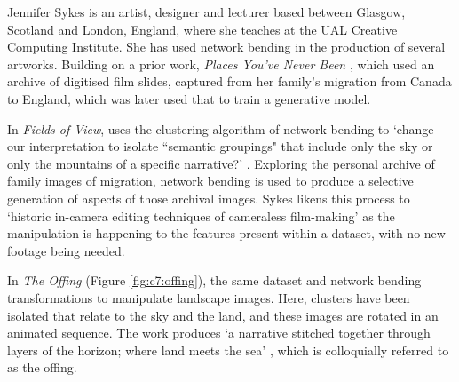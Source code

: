 Jennifer Sykes is an artist, designer and lecturer based between Glasgow, Scotland and London, England, where she teaches at the UAL Creative Computing Institute.
She has used network bending in the production of several artworks. Building on a prior work, \textit{Places You’ve Never Been} \citep{sykes2018places}, which used an archive of digitised film slides, captured from her family's migration from Canada to England, which was later used that to train a generative model. 

In \textit{Fields of View}, uses the clustering algorithm of network bending to `change our interpretation to isolate “semantic groupings" that include only the sky or only the mountains of a specific narrative?' \citep{sykes2021fields}. 
Exploring the personal archive of family images of migration, network bending is used to produce a selective generation of aspects of those archival images. 
Sykes likens this process to `historic in-camera editing techniques of cameraless film-making' \citep{sykes2021fields} as the manipulation is happening to the features present within a dataset, with no new footage being needed.

In \textit{The Offing} (Figure \ref{fig:c7:offing}), the same dataset and network bending transformations to manipulate landscape images. 
Here, clusters have been isolated that relate to the sky and the land, and these images are rotated in an animated sequence. 
The work produces `a narrative stitched together through layers of the horizon; where land meets the sea'  \cite{sykes2022offing}, which is colloquially referred to as the offing. 

